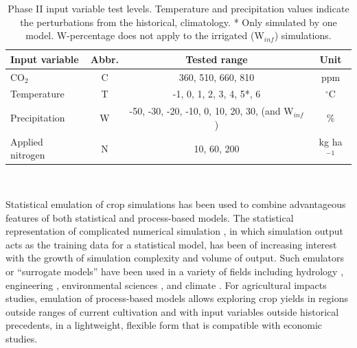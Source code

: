 \documentclass[preprint, 5p, times, twocolumn]{elsarticle}
\begin{document}
\begin{table}[!b]
    \small \centering
    \begin{tabular}[0.75\linewidth]{lccc} 
        \hline \vspace{1mm}
        \textbf{Input variable} & \textbf{Abbr.} & \textbf{Tested range} & \textbf{Unit}\\ \hline \hline \vspace{1mm}
        {CO$_2$}& {C} & {360, 510, 660, 810} & {ppm}\\ \hline \vspace{1mm}
        {Temperature}& {T} & {-1, 0, 1, 2, 3, 4, 5*, 6} & {$^{\circ}$C}\\ \hline \vspace{1mm}
        {Precipitation}& {W} & {-50, -30, -20, -10, 0, 10, 20, 30, (and W$_{inf}$)} & {\%}\\ \hline \vspace{1mm}
        {Applied nitrogen}& {N} & {10, 60, 200} & {kg ha$^{-1}$}\\ \hline
    \end{tabular}\\
    \parbox{11cm}{\caption{Phase II input variable test levels. Temperature and precipitation values indicate the perturbations from the historical, climatology. * Only simulated by one model. W-percentage does not apply to the irrigated (W$_{inf}$) simulations.}}
    \label{table:inputs}
\end{table}

Statistical emulation of crop simulations has been used to combine advantageous features of both statistical and process-based models. The statistical representation of complicated numerical simulation \citep[e.g.][]{OHAGAN2006, OHAGAN2010}, in which simulation output acts as the training data for a statistical model, has been of increasing interest with the growth of simulation complexity and volume of output. Such emulators or ``surrogate models'' have been used in a variety of fields including hydrology \citep{Razavi2012}, engineering \citep{STORLIE2009}, environmental sciences \citep{RATTO2012}, and climate \citep{Castruccio14}. For agricultural impacts studies, emulation of process-based models allows exploring crop yields in regions outside ranges of current cultivation and with input variables outside historical precedents, in a lightweight, flexible form that is compatible with economic studies. 
\end{document}
